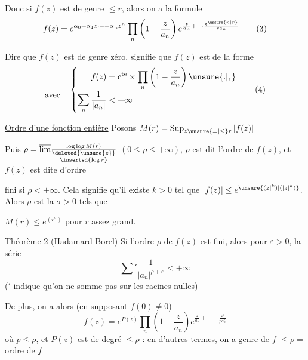 Donc si $f(z)$ est de genre $\leq r$, alors on a la formule
\[
f(z)=e^{\alpha_0+\alpha_1 z\mathord{\cdot}\mathord{-}+\alpha_n z^n}\prod_n\left(1-\frac{z}{a_n}\right)e^{\frac{z}{a_n}+\mathord{-}\mathord{\cdot}\frac{z^{\unsure{n|r}}}{r a_n}}\tag*{(3)}
\]

Dire que $f(z)$ est de genre zéro, signifie que $f(z)$ est de la forme
\[
\begin{aligned}\vphantom{f(z)}\\[-2pt]\text{avec}\quad\end{aligned}
\left\{\begin{aligned}
f(z)&=\mathrm c^{\mathrm{te}}\times\prod_n\left(1-\frac{z}{a_n}\right)\unsure{.|,}\\[-2pt]
\sum_n\frac{1}{|a_n|}&<+\infty
\end{aligned}\right.\tag*{(4)}
\]

\uline{Ordre d'une fonction entière} \quad Posons $M(r)=\mathop{\rm Sup}_{z\unsure{=|\leq}r}|f(z)|$

Puis $\rho=\overline{\lim}\frac{\log\log M(r)}{\substack{\deleted{\unsure{z}}\\\inserted{\log r}}}$ \quad $(0\leq\rho\leq+\infty)$, $\rho$ est dit l'ordre de $f(z)$, et $f(z)$ est dite d'ordre
\par\noindent\hspace{2cm}\unsure{$=$}\par\noindent
fini si $\rho<+\infty$. Cela signifie qu'il existe $k>0$ tel que $|f(z)|\leq e^{\unsure{(z\vert^k)|(\lvert z\rvert^k)}}$. Alors $\rho$ est la   $\sigma>0$ tels que



  $M(r)\leq e^{(r^\sigma)}$ pour $r$ assez grand.

\uline{Théorème 2} (Hadamard-Borel) Si l'ordre $\rho$ de $f(z)$
est fini, alors pour  $\varepsilon>0$, la série
\[
\sum{}'\frac{1}{|a_n|^{\rho+\varepsilon}}<+\infty \tag*{(5)}
\]
($'$ indique
qu'on ne somme pas sur les racines nulles)

De plus, on a alors (en supposant $f(0)\ne0$)
\[
f(z)=e^{P(z)}\prod_n\left(1-\frac{z}{a_n}\right)e^{\frac{z}{a_n}+\mathord{-}+\frac{z^p}{p a_n^p}}
\]
où $p\leq\rho$, et $P(z)$ est  
de degré $\leq\rho$ : en d'autres termes, on
a \qquad genre de $f$ $\leq\rho=$ ordre de $f$

